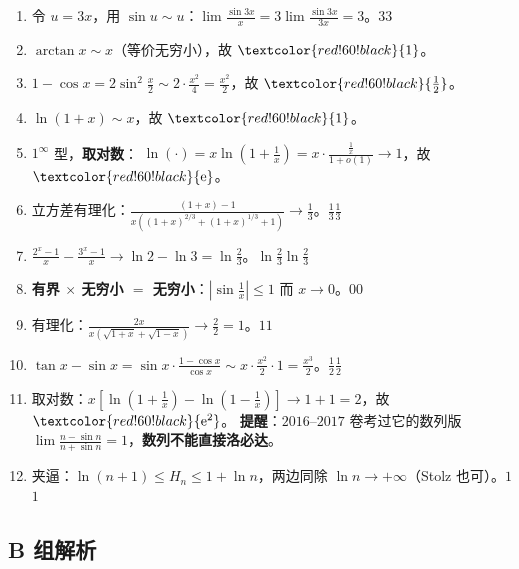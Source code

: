 \documentclass[11pt,a4paper]{ctexart}
\newcommand{\abs}[1]{\left\lvert #1\right\rvert}
\newcommand{\ee}{\mathrm{e}}
\newcommand{\ans}[1]{\ifmmode\textcolor{red!60!black}{#1}\else\textbf{\textcolor{red!60!black}{#1}}\fi}
\begin{document}
\begin{enumerate}[label=\textbf{A\arabic*.},start=1]
  \item 令 $u=3x$，用 $\sin u\sim u$：$\lim\frac{\sin 3x}{x}=3\lim\frac{\sin 3x}{3x}=3$。\ans{$3$}
  \item $\arctan x\sim x$（等价无穷小），故 $\ans{1}$。
  \item $1-\cos x=2\sin^{2}\frac{x}{2}\sim 2\cdot\frac{x^{2}}4=\frac{x^{2}}2$，故 $\ans{\frac12}$。
  \item $\ln(1+x)\sim x$，故 $\ans{1}$。
  \item $1^\infty$ 型，\textbf{取对数}：
        $\ln(\cdot)=x\ln\left(1+\frac1x\right)=x\cdot\frac{\frac1x}{1+o(1)}\to1$，故 $\ans{\ee}$。
  \item 立方差有理化：$\frac{(1+x)-1}{x\left((1+x)^{2/3}+(1+x)^{1/3}+1\right)}\to\frac13$。\ans{$\frac13$}
  \item $\frac{2^{x}-1}{x}-\frac{3^{x}-1}{x}\to\ln2-\ln3=\ln\frac23$。\ans{$\ln\frac23$}
  \item \textbf{有界 $\times$ 无穷小 $=$ 无穷小}：$\abs{\sin\frac1x}\le1$ 而 $x\to0$。\ans{$0$}
  \item 有理化：$\frac{2x}{x\left(\sqrt{1+x}+\sqrt{1-x}\right)}\to\frac22=1$。\ans{$1$}
  \item $\tan x-\sin x=\sin x\cdot\frac{1-\cos x}{\cos x}\sim x\cdot\frac{x^{2}}2\cdot1=\frac{x^{3}}2$。\ans{$\frac12$}
  \item 取对数：$x\left[\ln\left(1+\frac1x\right)-\ln\left(1-\frac1x\right)\right]\to 1+1=2$，故 $\ans{\ee^{2}}$。
        \textbf{提醒}：$2016$--$2017$ 卷考过它的数列版 $\lim\frac{n-\sin n}{n+\sin n}=1$，\textbf{数列不能直接洛必达}。
  \item 夹逼：$\ln(n+1)\le H_n\le1+\ln n$，两边同除 $\ln n\to+\infty$（Stolz 也可）。\ans{$1$}
\end{enumerate}

\subsection{B 组解析}
\end{document}
